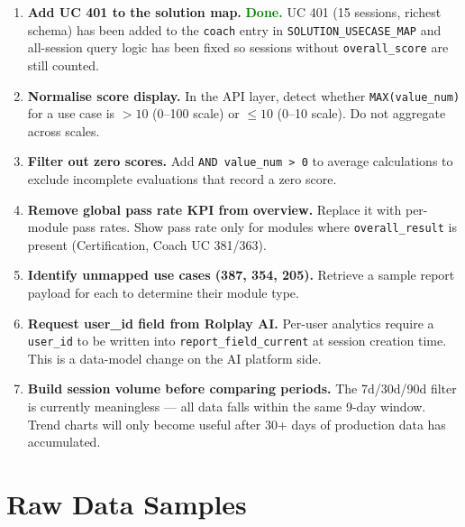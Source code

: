 \documentclass[12pt,a4paper]{article}
\newcommand{\good}[1]{\textcolor{green}{\textbf{#1}}}
\begin{document}
\begin{enumerate}[leftmargin=*, label=\textbf{\arabic*.}]

  \item \textbf{Add UC 401 to the solution map.} \good{Done.}
    UC 401 (15 sessions, richest schema) has been added to the \texttt{coach}
    entry in \texttt{SOLUTION\_USECASE\_MAP} and all-session query logic has
    been fixed so sessions without \texttt{overall\_score} are still counted.

  \item \textbf{Normalise score display.}
    In the API layer, detect whether \texttt{MAX(value\_num)} for a use case
    is $> 10$ (0--100 scale) or $\leq 10$ (0--10 scale).  Do not aggregate
    across scales.

  \item \textbf{Filter out zero scores.}
    Add \texttt{AND value\_num > 0} to average calculations to exclude
    incomplete evaluations that record a zero score.

  \item \textbf{Remove global pass rate KPI from overview.}
    Replace it with per-module pass rates.  Show pass rate only for modules
    where \texttt{overall\_result} is present (Certification, Coach UC 381/363).

  \item \textbf{Identify unmapped use cases (387, 354, 205).}
    Retrieve a sample report payload for each to determine their module type.

  \item \textbf{Request user\_id field from Rolplay AI.}
    Per-user analytics require a \texttt{user\_id} to be written into
    \texttt{report\_field\_current} at session creation time.  This is a
    data-model change on the AI platform side.

  \item \textbf{Build session volume before comparing periods.}
    The 7d/30d/90d filter is currently meaningless --- all data falls within
    the same 9-day window.  Trend charts will only become useful after
    30+ days of production data has accumulated.

\end{enumerate}

\appendix
\section{Raw Data Samples}
\end{document}
